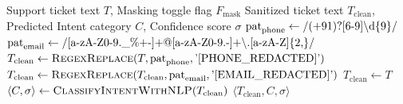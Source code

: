 \begin{algorithm}[H]
\caption{Automated Sensitive PII Masking and Ticket Triage (\texttt{support.js})}
\label{alg:pii_masking}
\begin{algorithmic}[1]
\Require Support ticket text $T$, Masking toggle flag $F_{\text{mask}}$
\Ensure Sanitized ticket text $T_{\text{clean}}$, Predicted Intent category $C$, Confidence score $\sigma$
    \State $\text{pat}_{\text{phone}} \gets \text{\texttt{/(+91)?[6-9]\textbackslash d\{9\}/}}$ 
    \State $\text{pat}_{\text{email}} \gets \text{\texttt{/[a-zA-Z0-9.\_\%+-]+@[a-zA-Z0-9.-]+\textbackslash.[a-zA-Z]\{2,\}/}}$
    \State $T_{\text{clean}} \gets \textsc{RegexReplace}(T, \text{pat}_{\text{phone}}, \text{\texttt{'[PHONE\_REDACTED]'}})$
    \State $T_{\text{clean}} \gets \textsc{RegexReplace}(T_{\text{clean}}, \text{pat}_{\text{email}}, \text{\texttt{'[EMAIL\_REDACTED]'}})$
\Else
    \State $T_{\text{clean}} \gets T$
\EndIf
\State $\langle C, \sigma \rangle \gets \textsc{ClassifyIntentWithNLP}(T_{\text{clean}})$ 
\State \Return $\langle T_{\text{clean}}, C, \sigma \rangle$
\end{algorithmic}
\end{algorithm}

